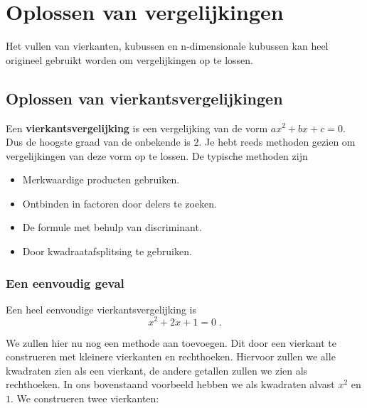 
\section{Oplossen van vergelijkingen}

Het vullen van vierkanten, kubussen en n-dimensionale kubussen kan heel origineel gebruikt worden om vergelijkingen op te lossen. 

\subsection{Oplossen van vierkantsvergelijkingen}

Een {\bf vierkantsvergelijking} is een vergelijking van de vorm $ax^2 + bx + c = 0$. Dus de hoogste graad van de onbekende is $2$. Je hebt reeds methoden gezien om vergelijkingen van deze vorm op te lossen. De typische methoden zijn
\begin{itemize}
  \item Merkwaardige producten gebruiken.
  \item Ontbinden in factoren door delers te zoeken.
  \item De formule met behulp van discriminant.
  \item Door kwadraatafsplitsing te gebruiken.
\end{itemize}


\answer[1cm]{}

\subsubsection{Een eenvoudig geval}

Een heel eenvoudige vierkantsvergelijking is
$$
x^2+2x+1=0\;.
$$



We zullen hier nu nog een methode aan toevoegen. Dit door een vierkant te construeren met kleinere vierkanten en rechthoeken. Hiervoor zullen we alle kwadraten zien als een vierkant, de andere getallen zullen we zien als rechthoeken. In ons bovenstaand voorbeeld hebben we als kwadraten alvast $x^2$ en $1$. We construeren twee vierkanten:

